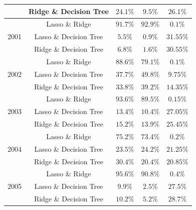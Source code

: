 \documentclass[11pt]{article}
\begin{document}
{\begin{table}[p]
\begin{tabular}{|c|c|c|c|c|}
      \cline{2-5}
                            & Ridge \& Decision Tree & $24.1\%$          & $9.5\%$           & $26.1\%$  \\
      \hline
      \multirow{3}{*}{2001} & Lasso \& Ridge         & $91.7\%$          & $92.9\%$          & $0.1\%$   \\
      \cline{2-5}
                            & Lasso \& Decision Tree & $5.5\%$           & $0.9\%$           & $31.55\%$ \\
      \cline{2-5}
                            & Ridge \& Decision Tree & $6.8\%$           & $1.6\%$           & $30.55\%$ \\
      \hline
      \multirow{3}{*}{2002} & Lasso \& Ridge         & $88.6\%$          & $79.1\%$          & $0.1\%$   \\
      \cline{2-5}
                            & Lasso \& Decision Tree & $37.7\%$          & $49.8\%$          & $9.75\%$  \\
      \cline{2-5}
                            & Ridge \& Decision Tree & $33.8\%$          & $39.2\%$          & $14.35\%$ \\
      \hline
      \multirow{3}{*}{2003} & Lasso \& Ridge         & $93.6\%$          & $89.5\%$          & $0.15\%$  \\
      \cline{2-5}
                            & Lasso \& Decision Tree & $13.4\%$          & $10.4\%$          & $27.05\%$ \\
      \cline{2-5}
                            & Ridge \& Decision Tree & $15.2\%$          & $13.9\%$          & $25.45\%$ \\
      \hline
      \multirow{3}{*}{2004} & Lasso \& Ridge         & $75.2\%$          & $73.4\%$          & $0.2\%$   \\
      \cline{2-5}
                            & Lasso \& Decision Tree & $23.5\%$          & $24.2\%$          & $21.25\%$ \\
      \cline{2-5}
                            & Ridge \& Decision Tree & $30.4\%$          & $20.4\%$          & $20.85\%$ \\
      \hline
      \multirow{3}{*}{2005} & Lasso \& Ridge         & $95.6\%$          & $90.8\%$          & $0.4\%$   \\
      \cline{2-5}
                            & Lasso \& Decision Tree & $9.9\%$           & $2.5\%$           & $27.5\%$  \\
      \cline{2-5}
                            & Ridge \& Decision Tree & $10.2\%$          & $5.2\%$           & $28.7\%$  \\

\end{tabular}
\end{table}}
\end{document}
